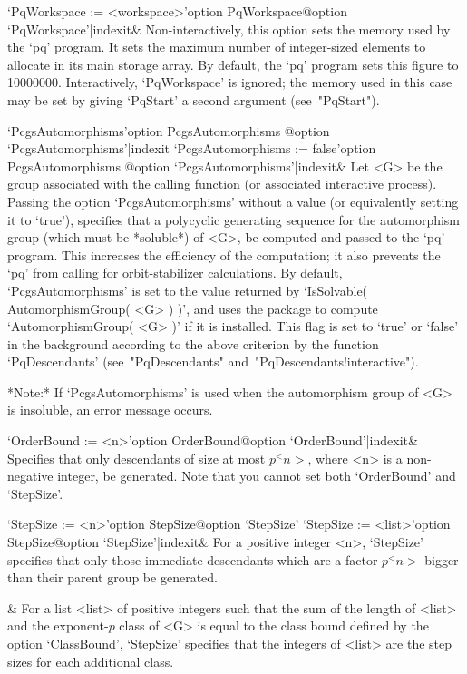 \>`PqWorkspace := <workspace>'{option PqWorkspace}@{option `PqWorkspace'|indexit}&
Non-interactively, this option sets the memory used by the `pq'  program.
It sets the maximum number of integer-sized elements to allocate  in  its
main storage array. By default, the `pq'  program  sets  this  figure  to
10000000. Interactively, `PqWorkspace' is ignored;  the  memory  used  in
this  case  may  be  set  by   giving   `PqStart'   a   second   argument
(see~"PqStart").

\>`PcgsAutomorphisms'{option PcgsAutomorphisms}%
@{option `PcgsAutomorphisms'|indexit}
\>`PcgsAutomorphisms := false'{option PcgsAutomorphisms}%
@{option `PcgsAutomorphisms'|indexit}&
Let <G> be the group associated with the calling function (or  associated
interactive process). Passing the option  `PcgsAutomorphisms'  without  a
value (or equivalently setting it to `true'), specifies that a polycyclic
generating sequence for the automorphism group (which must be  *soluble*)
of <G>, be computed and passed to the `pq'  program.  This  increases  the
efficiency of the computation; it also prevents  the  `pq'  from  calling
{\GAP} for orbit-stabilizer calculations. By default, `PcgsAutomorphisms'
is set to the value returned by `IsSolvable( AutomorphismGroup( <G> ) )',
and uses the package {\AutPGrp} to compute `AutomorphismGroup( <G> )'  if
it is installed. This flag is set to `true' or `false' in the  background
according  to  the  above  criterion  by  the  function   `PqDescendants'
(see~"PqDescendants" and~"PqDescendants!interactive").

*Note:*
If `PcgsAutomorphisms' is used when the  automorphism  group  of  <G>  is
insoluble, an error message occurs.

\>`OrderBound := <n>'{option OrderBound}@{option `OrderBound'|indexit}&
Specifies that only descendants of size at most $p^<n>$, where <n>  is  a
non-negative integer,  be  generated.  Note  that  you  cannot  set  both
`OrderBound' and `StepSize'.

\>`StepSize := <n>'{option StepSize}@{option `StepSize'}
\>`StepSize := <list>'{option StepSize}@{option `StepSize'|indexit}&
For  a  positive  integer  <n>,  `StepSize'  specifies  that  only  those
immediate descendants which are a factor $p^<n>$ bigger than their parent
group be generated.

&
For a list <list> of positive integers such that the sum of the length of
<list> and the exponent-$p$ class of <G> is  equal  to  the  class  bound
defined  by  the  option  `ClassBound',  `StepSize'  specifies  that  the
integers of <list> are the step sizes for each additional class.

